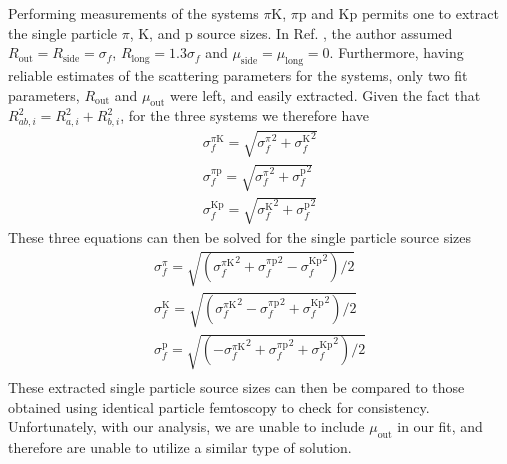 \documentclass[/home/jesse/Analysis/FemtoAnalysis/AnalysisNotes/AnalysisNoteJBuxton.tex]{subfiles}
\begin{document}
Performing measurements of the systems $\pi\mathrm{K}$, $\pi\mathrm{p}$ and $\mathrm{K}\mathrm{p}$ permits one to extract the single particle $\pi$, K, and p source sizes.
In Ref. \cite{Kisiel:2009eh}, the author assumed $R_{\mathrm{out}} = R_{\mathrm{side}} = \sigma_{f}$, $R_{\mathrm{long}} = 1.3\sigma_{f}$ and $\mu_{\mathrm{side}} = \mu_{\mathrm{long}} = 0$.
Furthermore, having reliable estimates of the scattering parameters for the systems, only two fit parameters, $R_{\mathrm{out}}$ and $\mu_{\mathrm{out}}$ were left, and easily extracted.
Given the fact that $R_{ab, i}^{2} = R_{a, i}^{2} + R_{b, i}^{2}$, for the three systems we therefore have
\begin{equation}
\begin{aligned}
\sigma_{f}^{\pi\mathrm{K}} = \sqrt{{\sigma_{f}^{\pi}}^{2} + {\sigma_{f}^{\mathrm{K}}}^{2}} \\
\sigma_{f}^{\pi\mathrm{p}} = \sqrt{{\sigma_{f}^{\pi}}^{2} + {\sigma_{f}^{\mathrm{p}}}^{2}} \\
\sigma_{f}^{\mathrm{K}\mathrm{p}} = \sqrt{{\sigma_{f}^{\mathrm{K}}}^{2} + {\sigma_{f}^{\mathrm{p}}}^{2}} 
\label{eqn:PiKPEqns1}
\end{aligned}
\end{equation}
These three equations can then be solved for the single particle source sizes
\begin{equation}
\begin{aligned}
\sigma_{f}^{\pi} = \sqrt{\left({\sigma_{f}^{\pi\mathrm{K}}}^{2} + {\sigma_{f}^{\pi\mathrm{p}}}^{2} - {\sigma_{f}^{\mathrm{K}\mathrm{p}}}^{2}\right)/2} \\
\sigma_{f}^{\mathrm{K}} = \sqrt{\left({\sigma_{f}^{\pi\mathrm{K}}}^{2} - {\sigma_{f}^{\pi\mathrm{p}}}^{2} + {\sigma_{f}^{\mathrm{K}\mathrm{p}}}^{2}\right)/2} \\
\sigma_{f}^{\mathrm{p}} = \sqrt{\left({-\sigma_{f}^{\pi\mathrm{K}}}^{2} + {\sigma_{f}^{\pi\mathrm{p}}}^{2} + {\sigma_{f}^{\mathrm{K}\mathrm{p}}}^{2}\right)/2} \\
\label{eqn:PiKPEqns2}
\end{aligned}
\end{equation}
These extracted single particle source sizes can then be compared to those obtained using identical particle femtoscopy to check for consistency.
Unfortunately, with our analysis, we are unable to include $\mu_{\mathrm{out}}$ in our fit, and therefore are unable to utilize a similar type of solution.


\clearpage
\end{document}
